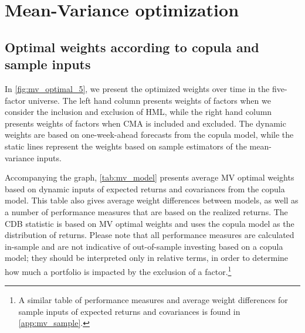 
\section{Mean-Variance optimization} %
\label{sec:mean_variance}

\subsection{Optimal weights according to copula and sample inputs}

In \autoref{fig:mv_optimal_5}, we present the optimized weights over time in the five-factor universe. The left hand column presents weights of factors when we consider the inclusion and exclusion of HML, while the right hand column presents weights of factors when CMA is included and excluded. The dynamic weights are based on one-week-ahead forecasts from the copula model, while the static lines represent the weights based on sample estimators of the mean-variance inputs.

Accompanying the graph, \autoref{tab:mv_model} presents average MV optimal weights based on dynamic inputs of expected returns and covariances from the copula model. This table also gives average weight differences between models, as well as a number of performance measures that are based on the realized returns. The CDB statistic is based on MV optimal weights and uses the copula model as the distribution of returns. Please note that all performance measures are calculated in-sample and are not indicative of out-of-sample investing based on a copula model; they should be interpreted only in relative terms, in order to determine how much a portfolio is impacted by the exclusion of a factor.\footnote{A similar table of performance measures and average weight differences for sample inputs of expected returns and covariances is found in \autoref{app:mv_sample}.}

